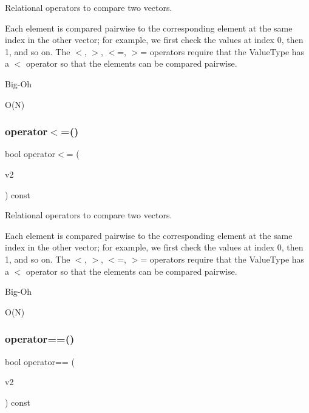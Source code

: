 Relational operators to compare two vectors. 

Each element is compared pairwise to the corresponding element at the same index in the other vector; for example, we first check the values at index 0, then 1, and so on. The $<$, $>$, $<$=, $>$= operators require that the Value\+Type has a $<$ operator so that the elements can be compared pairwise. \begin{DoxyRefDesc}{Big-\/\+Oh}
\item[\mbox{\hyperlink{BigOh__BigOh000148}{Big-\/\+Oh}}]O(\+N) \end{DoxyRefDesc}
\mbox{\label{classVector_ae70337b6c4c49dde850031de8b68c05d}} 
\subsubsection{\texorpdfstring{operator$<$=()}{operator<=()}}
{\footnotesize\ttfamily bool operator$<$= (\begin{DoxyParamCaption}\item[{const \mbox{\hyperlink{classVector}{Vector}}$<$ Value\+Type $>$ \&}]{v2 }\end{DoxyParamCaption}) const}



Relational operators to compare two vectors. 

Each element is compared pairwise to the corresponding element at the same index in the other vector; for example, we first check the values at index 0, then 1, and so on. The $<$, $>$, $<$=, $>$= operators require that the Value\+Type has a $<$ operator so that the elements can be compared pairwise. \begin{DoxyRefDesc}{Big-\/\+Oh}
\item[\mbox{\hyperlink{BigOh__BigOh000149}{Big-\/\+Oh}}]O(\+N) \end{DoxyRefDesc}
\mbox{\label{classVector_a31eebc4de791cf62b8fa12a0eeca90dc}} 
\subsubsection{\texorpdfstring{operator==()}{operator==()}}
{\footnotesize\ttfamily bool operator== (\begin{DoxyParamCaption}\item[{const \mbox{\hyperlink{classVector}{Vector}}$<$ Value\+Type $>$ \&}]{v2 }\end{DoxyParamCaption}) const}



